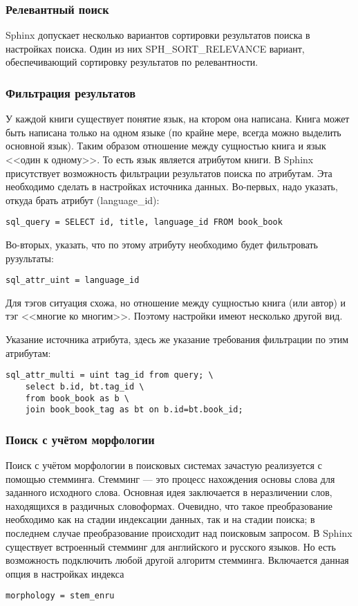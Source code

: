 \subsubsection{Релевантный поиск}

Sphinx допускает несколько вариантов сортировки результатов поиска в настройках поиска.
Один из них SPH\_SORT\_RELEVANCE вариант, обеспечивающий сортировку результатов по релевантности.

\subsubsection{Фильтрация результатов}

У каждой книги существует понятие язык, на ктором она написана.
Книга может быть написана только на одном языке (по крайне мере, всегда можно выделить основной язык).
Таким образом отношение между сущностью книга и язык <<один к одному>>.
То есть язык является атрибутом книги. В Sphinx присутствует возможность фильтрации результатов поиска по атрибутам.
Эта необходимо сделать в настройках источника данных. Во-первых, надо указать, откуда брать атрибут (language\_id):
\begin{verbatim}
sql_query = SELECT id, title, language_id FROM book_book
\end{verbatim}
Во-вторых, указать, что по этому атрибуту необходимо будет фильтровать рузультаты:
\begin{verbatim}
sql_attr_uint = language_id
\end{verbatim}

Для тэгов ситуация схожа, но отношение между сущностью книга (или автор) и тэг <<многие ко многим>>.
Поэтому настройки имеют несколько другой вид.

Указание источника атрибута, здесь же указание требования фильтрации по этим атрибутам:
\begin{verbatim}
sql_attr_multi = uint tag_id from query; \
	select b.id, bt.tag_id \
	from book_book as b \
	join book_book_tag as bt on b.id=bt.book_id;
\end{verbatim}


\subsubsection{Поиск с учётом морфологии}

Поиск с учётом морфологии в поисковых системах зачастую реализуется с помощью стемминга. Стемминг \cite{stemming} --- это процесс нахождения основы слова для заданного исходного слова.
Основная идея заключается в неразличении слов, находящихся в раздичных словоформах.
Очевидно, что такое преобразование необходимо как на стадии индексации данных, так и на стадии поиска; в последнем случае преобразование происходит над поисковым запросом.
В Sphinx существует встроенный стемминг для английского и русского языков.
Но есть возможность подключить любой другой алгоритм стемминга.
Включается данная опция в настройках индекса
\begin{verbatim}
morphology = stem_enru
\end{verbatim}

